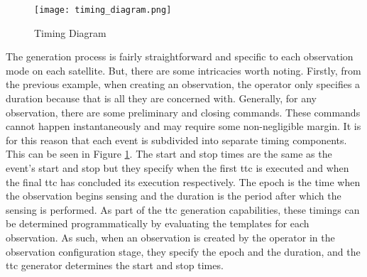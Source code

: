 \begin{figure}[h] 
    \centering
    \texttt{[image: timing\_diagram.png]} 
    \caption{Timing Diagram}
    \label{fig:timing} 
\end{figure}

The generation process is fairly straightforward and specific to each
observation mode on each satellite. But, there are some intricacies worth
noting. Firstly, from the previous example, when creating an observation, the
operator only specifies a duration because that is all they are concerned with.
Generally, for any observation, there are some preliminary and closing
commands. These commands cannot happen instantaneously and may require some
non-negligible margin. It is for this reason that each event is subdivided into
separate timing components. This can be seen in Figure \ref{fig:timing}. The
start and stop times are the same as the event’s start and stop but they
specify when the first \gls{ttc} is executed and when the final \gls{ttc} has
concluded its execution respectively. The epoch is the time when the
observation begins sensing and the duration is the period after which the
sensing is performed. As part of the \gls{ttc} generation capabilities, these
timings can be determined programmatically by evaluating the templates for each
observation. As such, when an observation is created by the operator in the
observation configuration stage, they specify the epoch and the duration, and
the \gls{ttc} generator determines the start and stop times.





